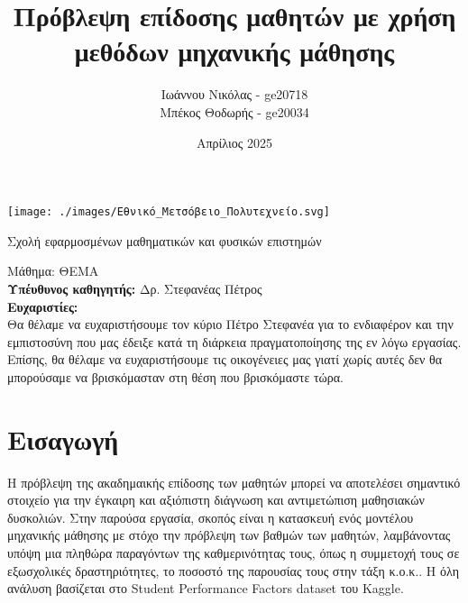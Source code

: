\documentclass[12pt]{article}
\title{Πρόβλεψη επίδοσης μαθητών με χρήση \\
 μεθόδων μηχανικής μάθησης}
\author{Ιωάννου Νικόλας - ge20718 
\\ Μπέκος Θοδωρής - ge20034}
\date{Απρίλιος 2025}
\begin{document}
\maketitle

\vspace{0.7cm}
\begin{center}
    \texttt{[image: ./images/Εθνικό\_Μετσόβειο\_Πολυτεχνείο.svg]}
    
    \Large Σχολή εφαρμοσμένων μαθηματικών και φυσικών επιστημών \\[1.5cm]
\end{center}



        
\vfill


        \noindent Μάθημα: ΘΕΜΑ \\[0.5cm]


        \noindent\textbf{Υπέυθυνος καθηγητής:} 
        Δρ. Στεφανέας Πέτρος \\[1cm]

\newpage
\noindent\textbf{Ευχαριστίες:} \\

\noindent Θα θέλαμε να ευχαριστήσουμε τον κύριο Πέτρο Στεφανέα για το ενδιαφέρον και
την εμπιστοσύνη που μας έδειξε κατά τη διάρκεια πραγματοποίησης της εν λόγω εργασίας. Επίσης, θα θέλαμε να ευχαριστήσουμε τις οικογένειες μας γιατί χωρίς αυτές δεν θα μπορούσαμε να βρισκόμασταν στη θέση που βρισκόμαστε τώρα.

\newpage
\renewcommand{\contentsname}{\Huge \textbf{Περιεχόμενα}}

\tableofcontents
\newpage

\section{Εισαγωγή}

Η πρόβλεψη της ακαδημαικής επίδοσης των μαθητών μπορεί να αποτελέσει σημαντικό στοιχείο για την έγκαιρη και αξιόπιστη διάγνωση και αντιμετώπιση μαθησιακών δυσκολιών. Στην παρούσα εργασία, σκοπός είναι η κατασκευή ενός μοντέλου μηχανικής μάθησης με στόχο την πρόβλεψη των βαθμών των μαθητών, λαμβάνοντας υπόψη μια πληθώρα παραγόντων της καθμερινότητας τους, όπως η συμμετοχή τους σε εξωσχολικές δραστηριότητες, το ποσοστό της παρουσίας τους στην τάξη κ.ο.κ.. Η όλη ανάλυση βασίζεται στο Student Performance Factors dataset του Kaggle. 
\\
\end{document}
